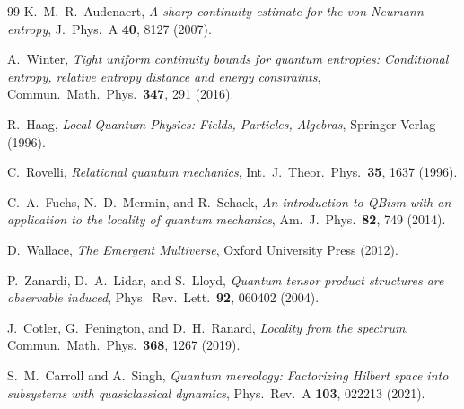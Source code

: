 \documentclass[12pt,a4paper]{article}
\begin{document}
\begin{thebibliography}{99}
K.~M.~R.~Audenaert, \emph{A sharp continuity estimate for the von Neumann entropy}, J.\ Phys.\ A \textbf{40}, 8127 (2007).

A.~Winter, \emph{Tight uniform continuity bounds for quantum entropies: Conditional entropy, relative entropy distance and energy constraints}, Commun.\ Math.\ Phys.\ \textbf{347}, 291 (2016).

R.~Haag, \emph{Local Quantum Physics: Fields, Particles, Algebras}, Springer-Verlag (1996).

C.~Rovelli, \emph{Relational quantum mechanics}, Int.\ J.\ Theor.\ Phys.\ \textbf{35}, 1637 (1996).

C.~A.~Fuchs, N.~D.~Mermin, and R.~Schack, \emph{An introduction to QBism with an application to the locality of quantum mechanics}, Am.\ J.\ Phys.\ \textbf{82}, 749 (2014).

D.~Wallace, \emph{The Emergent Multiverse}, Oxford University Press (2012).

P.~Zanardi, D.~A.~Lidar, and S.~Lloyd, \emph{Quantum tensor product structures are observable induced}, Phys.\ Rev.\ Lett.\ \textbf{92}, 060402 (2004).

J.~Cotler, G.~Penington, and D.~H.~Ranard, \emph{Locality from the spectrum}, Commun.\ Math.\ Phys.\ \textbf{368}, 1267 (2019).

S.~M.~Carroll and A.~Singh, \emph{Quantum mereology: Factorizing Hilbert space into subsystems with quasiclassical dynamics}, Phys.\ Rev.\ A \textbf{103}, 022213 (2021).

\end{thebibliography}
\end{document}
